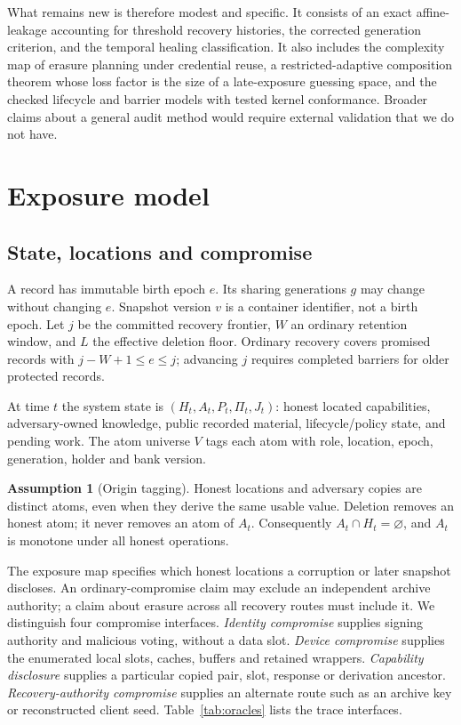 \documentclass[pdflatex,sn-mathphys-num]{sn-jnl}
\theoremstyle{plain}
\theoremstyle{definition}
\newtheorem{assumption}{Assumption}
\begin{document}
What remains new is therefore modest and specific. It consists of an exact affine-leakage accounting for threshold recovery histories, the corrected generation criterion, and the temporal healing classification. It also includes the complexity map of erasure planning under credential reuse, a restricted-adaptive composition theorem whose loss factor is the size of a late-exposure guessing space, and the checked lifecycle and barrier models with tested kernel conformance. Broader claims about a general audit method would require external validation that we do not have.


\section{Exposure model}\label{sec:model}

\subsection{State, locations and compromise}
A record has immutable birth epoch $e$. Its sharing generations $g$ may change without changing $e$. Snapshot version $v$ is a container identifier, not a birth epoch. Let $j$ be the committed recovery frontier, $W$ an ordinary retention window, and $L$ the effective deletion floor. Ordinary recovery covers promised records with $j-W+1\le e\le j$; advancing $j$ requires completed barriers for older protected records.

At time $t$ the system state is $(H_t,A_t,P_t,\Pi_t,J_t)$: honest located capabilities, adversary-owned knowledge, public recorded material, lifecycle/policy state, and pending work. The atom universe $V$ tags each atom with role, location, epoch, generation, holder and bank version.

\begin{assumption}[Origin tagging]\label{ass:origin}
Honest locations and adversary copies are distinct atoms, even when they derive the same usable value. Deletion removes an honest atom; it never removes an atom of $A_t$. Consequently $A_t\cap H_t=\varnothing$, and $A_t$ is monotone under all honest operations.
\end{assumption}

The exposure map specifies which honest locations a corruption or later snapshot discloses. An ordinary-compromise claim may exclude an independent archive authority; a claim about erasure across all recovery routes must include it. We distinguish four compromise interfaces. \emph{Identity compromise} supplies signing authority and malicious voting, without a data slot. \emph{Device compromise} supplies the enumerated local slots, caches, buffers and retained wrappers. \emph{Capability disclosure} supplies a particular copied pair, slot, response or derivation ancestor. \emph{Recovery-authority compromise} supplies an alternate route such as an archive key or reconstructed client seed. Table~\ref{tab:oracles} lists the trace interfaces.
\end{document}

